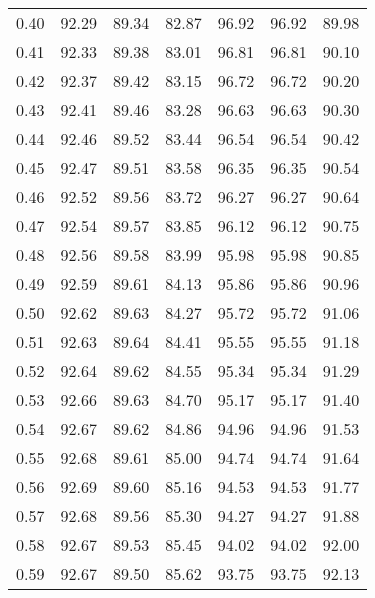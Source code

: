 \begin{tabular}{|c|c|c|c|c|c|c|}
      0.40 &     92.29 &     89.34 &      82.87 &   96.92 &      96.92 &         89.98 \\
      0.41 &     92.33 &     89.38 &      83.01 &   96.81 &      96.81 &         90.10 \\
      0.42 &     92.37 &     89.42 &      83.15 &   96.72 &      96.72 &         90.20 \\
      0.43 &     92.41 &     89.46 &      83.28 &   96.63 &      96.63 &         90.30 \\
      0.44 &     92.46 &     89.52 &      83.44 &   96.54 &      96.54 &         90.42 \\
      0.45 &     92.47 &     89.51 &      83.58 &   96.35 &      96.35 &         90.54 \\
      0.46 &     92.52 &     89.56 &      83.72 &   96.27 &      96.27 &         90.64 \\
      0.47 &     92.54 &     89.57 &      83.85 &   96.12 &      96.12 &         90.75 \\
      0.48 &     92.56 &     89.58 &      83.99 &   95.98 &      95.98 &         90.85 \\
      0.49 &     92.59 &     89.61 &      84.13 &   95.86 &      95.86 &         90.96 \\
      0.50 &     92.62 &     89.63 &      84.27 &   95.72 &      95.72 &         91.06 \\
      0.51 &     92.63 &     89.64 &      84.41 &   95.55 &      95.55 &         91.18 \\
      0.52 &     92.64 &     89.62 &      84.55 &   95.34 &      95.34 &         91.29 \\
      0.53 &     92.66 &     89.63 &      84.70 &   95.17 &      95.17 &         91.40 \\
      0.54 &     92.67 &     89.62 &      84.86 &   94.96 &      94.96 &         91.53 \\
      0.55 &     92.68 &     89.61 &      85.00 &   94.74 &      94.74 &         91.64 \\
      0.56 &     92.69 &     89.60 &      85.16 &   94.53 &      94.53 &         91.77 \\
      0.57 &     92.68 &     89.56 &      85.30 &   94.27 &      94.27 &         91.88 \\
      0.58 &     92.67 &     89.53 &      85.45 &   94.02 &      94.02 &         92.00 \\
      0.59 &     92.67 &     89.50 &      85.62 &   93.75 &      93.75 &         92.13 \\

\end{tabular}
